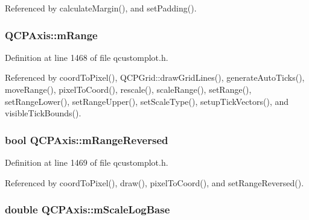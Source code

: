 Referenced by calculate\+Margin(), and set\+Padding().

\hypertarget{class_q_c_p_axis_a1ee36773c49062d751560e11f90845f7}{}
\subsubsection[{m\+Range}]{ Q\+C\+P\+Axis\+::m\+Range\hspace{0.3cm}{\ttfamily [protected]}}\label{class_q_c_p_axis_a1ee36773c49062d751560e11f90845f7}


Definition at line 1468 of file qcustomplot.\+h.



Referenced by coord\+To\+Pixel(), Q\+C\+P\+Grid\+::draw\+Grid\+Lines(), generate\+Auto\+Ticks(), move\+Range(), pixel\+To\+Coord(), rescale(), scale\+Range(), set\+Range(), set\+Range\+Lower(), set\+Range\+Upper(), set\+Scale\+Type(), setup\+Tick\+Vectors(), and visible\+Tick\+Bounds().

\hypertarget{class_q_c_p_axis_a5cb034f57aa3d773a9ca55a0931dbf7b}{}
\subsubsection[{m\+Range\+Reversed}]{\setlength{\rightskip}{0pt plus 5cm}bool Q\+C\+P\+Axis\+::m\+Range\+Reversed\hspace{0.3cm}{\ttfamily [protected]}}\label{class_q_c_p_axis_a5cb034f57aa3d773a9ca55a0931dbf7b}


Definition at line 1469 of file qcustomplot.\+h.



Referenced by coord\+To\+Pixel(), draw(), pixel\+To\+Coord(), and set\+Range\+Reversed().

\hypertarget{class_q_c_p_axis_abc727ddb4af745151755d1b5e60d03c3}{}
\subsubsection[{m\+Scale\+Log\+Base}]{\setlength{\rightskip}{0pt plus 5cm}double Q\+C\+P\+Axis\+::m\+Scale\+Log\+Base\hspace{0.3cm}{\ttfamily [protected]}}\label{class_q_c_p_axis_abc727ddb4af745151755d1b5e60d03c3}


